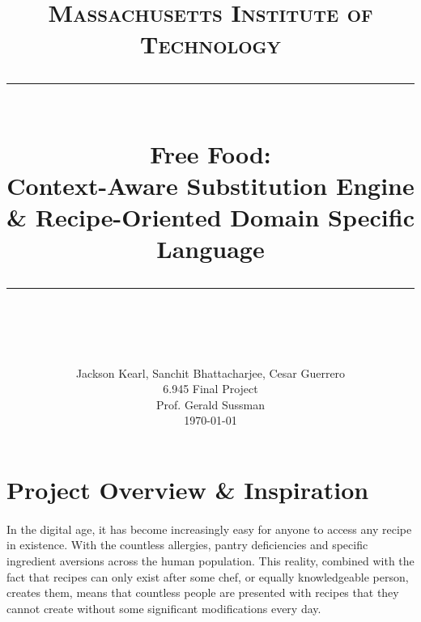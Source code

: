 \newcommand{\horrule}[1]{\rule{\linewidth}{#1}} 	%
\newcommand{\code}[1]{\texttt{#1}}

\title{
		\normalfont \normalsize \textsc{Massachusetts Institute of Technology} \\ [25pt]
		\horrule{0.5pt} \\[0.4cm]
		\huge Free Food: \\Context-Aware Substitution Engine \& Recipe-Oriented Domain Specific Language \\
		\horrule{2pt} \\[0.5cm]
}
\author{
		\normalfont 								\normalsize
        Jackson Kearl, Sanchit Bhattacharjee, Cesar Guerrero\\[-3pt]		\normalsize
        6.945 Final Project \\[-3pt] \normalsize
        Prof. Gerald Sussman \\[-3pt] \normalsize
        \today \normalsize
        \\
}
\date{}



\maketitle















\newpage
\section{Project Overview \& Inspiration}
\paragraph{}
In the digital age, it has become increasingly easy for anyone to access any recipe in existence. With the countless allergies, pantry deficiencies and specific ingredient aversions across the human population. This reality, combined with the fact that recipes can only exist after some chef, or equally knowledgeable person, creates them, means that countless people are presented with recipes that they cannot create without some significant modifications every day.

